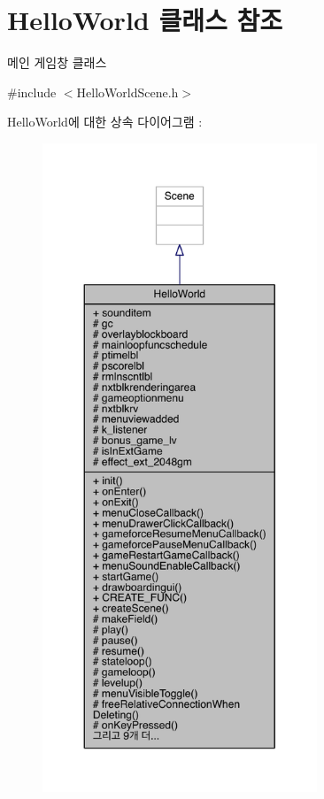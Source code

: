 \hypertarget{class_hello_world}{}\section{Hello\+World 클래스 참조}
\label{class_hello_world}


메인 게임창 클래스  




{\ttfamily \#include $<$Hello\+World\+Scene.\+h$>$}



Hello\+World에 대한 상속 다이어그램 \+: 
\nopagebreak
\begin{figure}[H]
\begin{center}
\leavevmode
\includegraphics[height=550pt]{d2/da7/class_hello_world__inherit__graph}
\end{center}
\end{figure}


